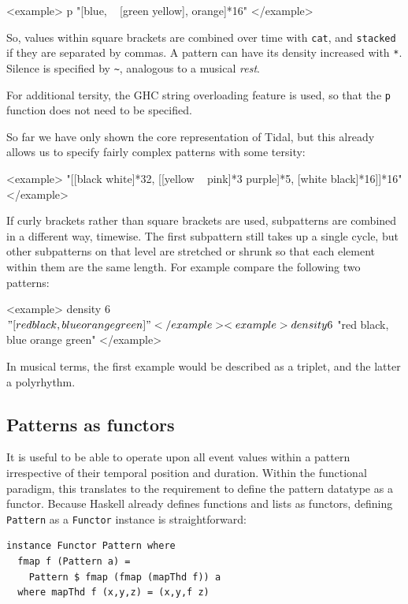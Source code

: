 \documentclass[authoryear]{sigplanconf}
\begin{document}
<example>
p "[blue, ~ [green yellow], orange]*16"
</example>

So, values within square brackets are combined over time with
\lstinline{cat}, and \lstinline{stacked} if they are separated by
commas. A pattern can have its density increased with
\lstinline{*}. Silence is specified by \lstinline{~}, analogous to a
musical \emph{rest}.

For additional tersity, the GHC string overloading feature is used, so
that the \lstinline{p} function does not need to be specified.

So far we have only shown the core representation of Tidal, but this
already allows us to specify fairly complex patterns with some tersity:

<example>
"[[black white]*32, [[yellow ~ pink]*3 purple]*5, [white black]*16]]*16"
</example>

If curly brackets rather than square brackets are used, subpatterns
are combined in a different way, timewise. The first subpattern still
takes up a single cycle, but other subpatterns on that level are
stretched or shrunk so that each element within them are the same
length. For example compare the following two patterns:

<example>
density 6 $ "[red black, blue orange green]"
</example>


<example>
density 6 $ "{red black, blue orange green}"
</example>

In musical terms, the first example would be described as a triplet,
and the latter a polyrhythm.

\subsection{Patterns as functors}

It is useful to be able to operate upon all event values within a
pattern irrespective of their temporal position and duration. Within
the functional paradigm, this translates to the requirement to define
the pattern datatype as a functor. Because Haskell already defines
functions and lists as functors, defining \lstinline{Pattern} as a
\lstinline{Functor} instance is straightforward:

\begin{center}
\begin{minipage}{0.5\textwidth}
\begin{lstlisting}
instance Functor Pattern where
  fmap f (Pattern a) = 
    Pattern $ fmap (fmap (mapThd f)) a
  where mapThd f (x,y,z) = (x,y,f z)
\end{lstlisting}
\end{minipage}
\end{center}
\end{document}
